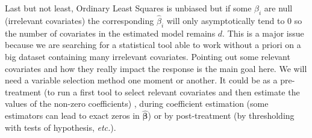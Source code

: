 \documentclass[12pt,a4paper]{report}
\begin{document}
	Last but not least, Ordinary Least Squares is unbiased but if some $\beta_i$ are null (irrelevant covariates) the corresponding $\hat{\beta}_i$ will only asymptotically tend to 0 so the number of covariates in the estimated model remains $d$. This is a major issue because we are searching for a statistical tool able to work without a priori on a big dataset containing many irrelevant covariates. Pointing out some relevant covariates and how they really impact the response is the main goal here. We will need a variable selection method one moment or another. It could be as a pre-treatment (to run a first tool to select relevant covariates and then estimate the values of the non-zero coefficients) , during coefficient estimation (some estimators can lead to exact zeros in $\hat{\boldsymbol{\beta}}$) or by post-treatment (by thresholding with tests of hypothesis, {\it etc.}). \\
\\	
	\\
%	
	
\end{document}
